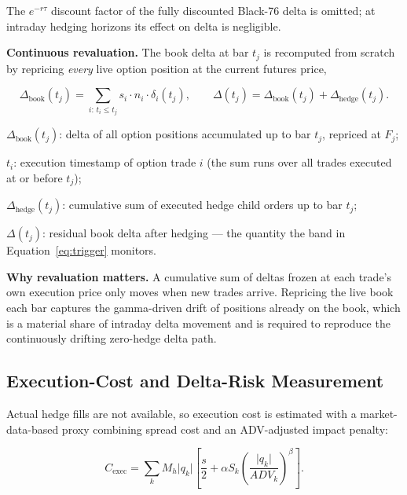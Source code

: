 \documentclass{article}
\begin{document}
The $e^{-r\tau}$ discount factor of the fully discounted Black-76 delta is omitted; at
intraday hedging horizons its effect on delta is negligible.

\textbf{Continuous revaluation.} The book delta at bar $t_j$ is recomputed from scratch
by repricing \emph{every} live option position at the current futures price,

\begin{eqbox}
\begin{equation}
\Delta_{\text{book}}(t_j) = \sum_{i:\,t_i \le t_j} s_i \cdot n_i \cdot \delta_i(t_j),
\qquad
\Delta(t_j) = \Delta_{\text{book}}(t_j) + \Delta_{\text{hedge}}(t_j).
\end{equation}
\end{eqbox}

\begin{vardefs}
\item $\Delta_{\text{book}}(t_j)$: delta of all option positions accumulated up to bar
  $t_j$, repriced at $F_j$;
\item $t_i$: execution timestamp of option trade $i$ (the sum runs over all trades
  executed at or before $t_j$);
\item $\Delta_{\text{hedge}}(t_j)$: cumulative sum of executed hedge child orders up to
  bar $t_j$;
\item $\Delta(t_j)$: residual book delta after hedging --- the quantity the band in
  Equation~\eqref{eq:trigger} monitors.
\end{vardefs}

\begin{whybox}
\textbf{Why revaluation matters.} A cumulative sum of deltas frozen at each trade's own
execution price only moves when new trades arrive. Repricing the live book each bar
captures the gamma-driven drift of positions already on the book, which is a material
share of intraday delta movement and is required to reproduce the continuously drifting
zero-hedge delta path.
\end{whybox}

\subsection{Execution-Cost and Delta-Risk Measurement}

Actual hedge fills are not available, so execution cost is estimated with a
market-data-based proxy combining spread cost and an ADV-adjusted impact penalty:

\begin{eqbox}
\begin{equation}
C_{\text{exec}} = \sum_k M_h \lvert q_k \rvert
\left[ \frac{s}{2} + \alpha S_k \left( \frac{\lvert q_k \rvert}{ADV_k} \right)^{\!\beta} \right].
\label{eq:cost}
\end{equation}
\end{eqbox}
\end{document}
